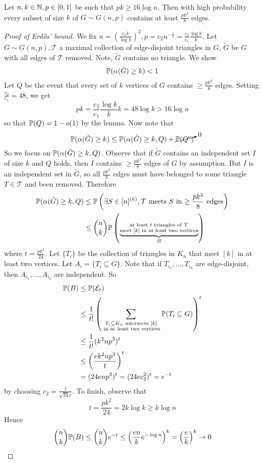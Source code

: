 \documentclass{article}
\begin{document}
\begin{lemma}
  Let $n, k \in \N, p \in [0, 1]$ be such that $pk \ge 16\log n$. Then with high probability every subset of size $k$ of $G \sim G(n, p)$ contains at least $\frac{pk^2}8$ edges.
\end{lemma}

\begin{proof}[Proof of Erd\H os' bound]
  We fix $n = \left(\frac{c_1 k}{\log k}\right)^2, p = c_2n^{-\frac 12} = \frac{c_2}{c_1}\frac{\log k}k$. Let $G \sim G(n, p), \mathcal T$ a maximal collection of edge-disjoint triangles in $G$, $\tilde G$ be $G$ with all edges of $\mathcal T$ removed. Note, $\tilde G$ contains no triangle. We show
  $$\P(\alpha(\tilde G) \ge k) < 1$$
  Let $Q$ be the event that every set of $k$ vertices of $G$ contains $\ge \frac{pk^2}8$ edges. Setting $\frac{c_2}{c_1} = 48$, we get
  $$pk = \frac{c_2}{c_1}\frac{\log k}k k = 48\log k > 16\log n$$
  so that $\P(Q) = 1 - o(1)$ by the lemma. Now note that
  $$\P(\alpha(\tilde G) \ge k) \le \P(\alpha(\tilde G) \ge k, Q) + \cancelto 0{\P(Q^c)}$$
  So we focus on $\P(\alpha(\tilde G) \ge k, Q)$. Observe that if $\tilde G$ contains an independent set $I$ of size $k$ and $Q$ holds, then $I$ contains $\ge \frac{pk^2}8$ edges of $G$ by assumption. But $I$ is an independent set in $\tilde G$, so all $\frac{pk^2}8$ edges must have belonged to some triangle $T \in \mathcal T$ and been removed. Therefore
  \begin{align*}
    \P(\alpha(\tilde G) \ge k, Q)
    & \le \P\left(\exists S \in [n]^{(k)}, \mathcal T \text{ meets $S$ in $\ge \frac{pk^2}8$ edges}\right) \\
    & \le \binom n k \P\left(\underbrace{\substack{\text{at least $t$ triangles of $\mathcal T$} \\ \text{meet $[k]$ in at least two vertices}}}_B\right)
  \end{align*}
  where $t = \frac{pk^2}{24}$. Let $\{T_i\}$ be the collection of triangles in $K_n$ that meet $[k]$ in at least two vertices. Let $A_i = \{T_i \subseteq G\}$. Note that if $T_{i_1}, \dots, T_{i_k}$ are edge-disjoint, then $A_{i_1}, \dots, A_{i_k}$ are independent. So
  \begin{align*}
    \P(B)
    & \le \P(\Eps_t) \\
    & \le \frac 1{t!}\left(\sum_{\substack{T_i \subseteq K_n \text{ intersects } [k] \\ \text{ in at least two vertices}}} \P(T_i \subseteq G)\right)^t \\
    & \le \frac 1{t!} (k^2np^3)^t \\
    & \le \left(\frac{ek^2np^3}t\right)^t \\
    & = (24enp^2)^t = (24ec_2^2)^t = e^{-t}
  \end{align*}
  by choosing $c_2 = \frac 1{\sqrt{24} e}$. To finish, observe that
  $$t = \frac{pk^2}{24} = 2k\log k \ge k\log n$$
  Hence
  $$\binom n k \P(B) \le \binom n k e^{-t} \le \left(\frac{en}k e^{-\log n}\right)^k = \left(\frac ek\right)^k \to 0$$
\end{proof}
\end{document}
